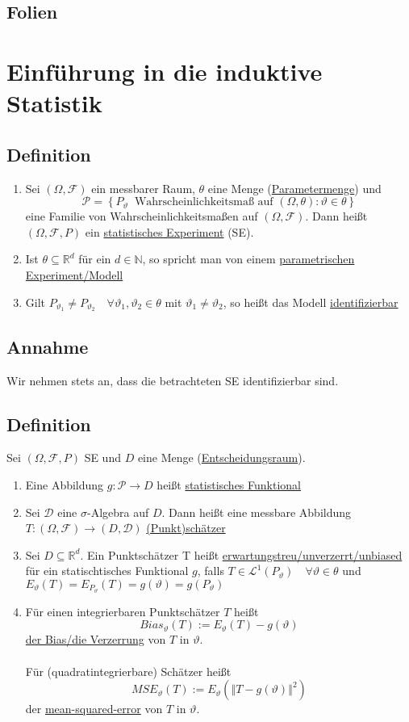 \documentclass[german,10pt,oneside, fleqn, a4paper]{article}
\newcommand {\R}	{\mathbb{R}}
\newcommand {\N}	{\mathbb{N}}
\newcommand{\ra}{\rightarrow}
\newcommand{\brc}[1]{\left(#1\right)}
\newcommand{\brac}[1]{\left\lbrace #1\right\rbrace}
\newcommand{\norm}[1]{\left\Vert #1 \right\Vert}
\newcommand{\mc}[1]{\mathcal{#1}}
\newcommand{\lp}[1]{\mc{L}^{#1}}
\newcommand{\1}[1]{1_{#1}}
\newcommand{\2}[1]{\1{\brac{#1}}}
\newcommand{\raum}{\brc{\Omega,\mc{F},P}}
\newcommand{\f}{\mc{F}}
\newcommand{\p}{\mc{P}}
\newcommand{\qf}{\quad\forall}
\begin{document}
\subsection{Folien}
%


\pagebreak
\section{Einführung in die induktive Statistik}
\subsection{Definition}
\label{9.1}
\begin{enumerate}[label=(\roman*)]
\item Sei $(\Omega,\f)$ ein messbarer Raum, $\theta$ eine Menge (\underline{Parametermenge}) und \[\p=\brac{P_\vartheta\ \text{ Wahrscheinlichkeitsmaß auf }(\Omega,\theta):\vartheta\in\theta}\]
eine Familie von Wahrscheinlichkeitsmaßen auf $(\Omega,\f)$. Dann heißt $\raum$ ein \underline{statistisches Experiment} (SE).
\item Ist $\theta\subseteq\R^d$ für ein $d\in\N$, so spricht man von einem \underline{parametrischen Experiment/Modell}
\item Gilt $P_{\vartheta_1}\neq P_{\vartheta_2}\qf \vartheta_1,\vartheta_2\in\theta$ mit $\vartheta_1\neq\vartheta_2$, so heißt das Modell \underline{identifizierbar}
\end{enumerate}

\subsection{Annahme}
\label{9.2}
Wir nehmen stets an, dass die betrachteten SE identifizierbar sind.

\subsection{Definition}
\label{9.3}
Sei $\raum$ SE und $D$ eine Menge (\underline{Entscheidungsraum}).\begin{enumerate}[label=(\alph*)]
\item Eine Abbildung $g:\p\ra D$ heißt \underline{statistisches Funktional}
\item Sei $\mc{D}$ eine $\sigma$-Algebra auf $D$. Dann heißt eine messbare Abbildung $T:(\Omega,\f)\ra(D,\mc{D})$ \underline{(Punkt)schätzer}
\item Sei $D\subseteq\R^d$. Ein Punktschätzer T heißt \underline{erwartungstreu/unverzerrt/unbiased} für ein statischtisches Funktional $g$, falls $T\in\lp{1}(P_\vartheta)\qf \vartheta\in\theta$ und $E_\vartheta(T)=E_{P_\vartheta}(T)=g(\vartheta)=g(P_\vartheta)$
\item Für einen integrierbaren Punktschätzer $T$ heißt \[
Bias_\vartheta(T):=E_\vartheta(T)-g(\vartheta)\]
\underline{der Bias/die Verzerrung} von $T$ in $\vartheta$.\\
\\
Für (quadratintegrierbare) Schätzer heißt \[
MSE_\vartheta(T):=E_\vartheta(\norm{T-g(\vartheta)}^2)\]
der \underline{mean-squared-error} von $T$ in $\vartheta$.
\end{enumerate}
\end{document}
